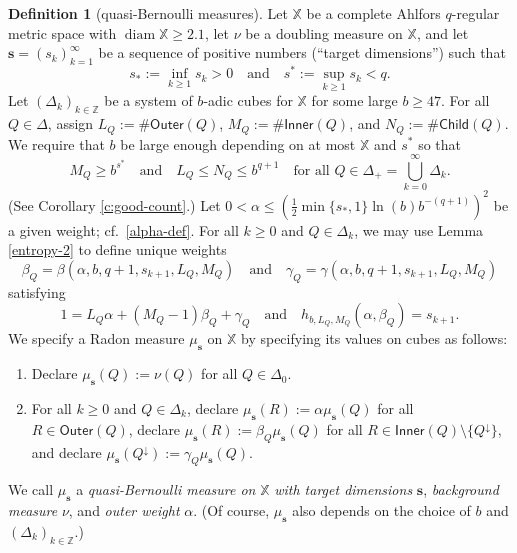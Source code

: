 \documentclass[12pt]{amsart}
\theoremstyle{definition}
\newtheorem{definition}[theorem]{Definition}
\theoremstyle{remark}
\newcommand{\ZZ}{\mathbb{Z}}
\newcommand{\XX}{\mathbb{X}}
\newcommand{\diam}{\mathop\mathrm{diam}\nolimits}
\newcommand{\muse}{\mu_{\mathbf{s}}}
\newcommand{\Child}{\mathsf{Child}}
\newcommand{\Outer}{\mathsf{Outer}}
\newcommand{\Inner}{\mathsf{Inner}}
\numberwithin{figure}{section}
\numberwithin{equation}{section}
\begin{document}
\begin{definition}[quasi-Bernoulli measures] \label{regime-measures} Let $\XX$ be a complete Ahlfors $q$-regular metric space with $\diam\XX\geq 2.1$, let $\nu$ be a doubling measure on $\XX$, and let $\mathbf{s}=(s_k)_{k=1}^\infty$ be a sequence of positive numbers (``target dimensions'') such that \begin{equation}s_*:=\inf_{k\geq 1}s_k>0\quad\text{and}\quad s^*:=\sup_{k\geq 1} s_k<q.\end{equation} Let $(\Delta_k)_{k\in\ZZ}$ be a system of $b$-adic cubes for $\XX$ for some large $b\geq 47$. For all  $Q\in\Delta$, assign $L_Q:=\#\Outer(Q)$, $M_Q:=\#\Inner(Q)$, and $N_Q:=\#\Child(Q)$. We require that $b$ be large enough depending on at most $\XX$ and $s^*$ so that \begin{equation}\label{LM-bounds}M_Q\geq b^{s^*}\quad\text{and}\quad L_Q\leq N_Q\leq b^{q+1}\quad\text{for all $Q\in\Delta_+=\bigcup_{k=0}^\infty \Delta_k$.}\end{equation} (See Corollary \ref{c:good-count}.) Let $0<\alpha\leq \left(\frac12\min\{s_*,1\}\ln(b)b^{-(q+1)}\right)^2$ be a given weight; cf.~\eqref{alpha-def}. For all $k\geq 0$ and $Q\in\Delta_k$, we may use Lemma \ref{entropy-2} to define unique weights $$\beta_Q=\beta(\alpha,b,q+1,s_{k+1},L_Q,M_Q)\quad\text{and}\quad \gamma_Q=\gamma(\alpha,b,q+1,s_{k+1},L_Q,M_Q)$$ satisfying \begin{equation}\label{qb-weights} 1=L_Q\alpha+(M_Q-1)\beta_Q+\gamma_Q\quad\text{and}\quad h_{b,L_Q,M_Q}(\alpha,\beta_Q)=s_{k+1}.\end{equation} We specify a Radon measure $\muse$ on $\XX$ by specifying its values on cubes as follows: \begin{enumerate}
\item Declare $\muse(Q):=\nu(Q)$ for all $Q\in\Delta_0$.
\item For all $k\geq 0$ and $Q\in\Delta_k$, declare $\muse(R):=\alpha\muse(Q)$ for all $R\in\Outer(Q)$, declare $\muse(R):=\beta_Q\muse(Q)$ for all $R\in\Inner(Q)\setminus\{Q^\downarrow\}$, and declare $\muse(Q^{\downarrow}):=\gamma_Q\muse(Q)$.
\end{enumerate} We call $\muse$ a \emph{quasi-Bernoulli measure on} $\XX$ \emph{with target dimensions} $\mathbf{s}$, \emph{background measure} $\nu$, and \emph{outer weight} $\alpha$. (Of course, $\muse$ also depends on the choice of $b$ and $(\Delta_k)_{k\in\ZZ}$.)
\end{definition}
\end{document}
